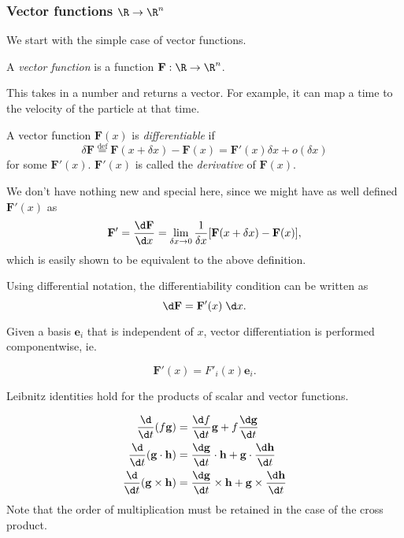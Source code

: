 \documentclass[a4paper]{article}
\begin{document}
\subsubsection*{Vector functions \texorpdfstring{$\R \to \R^n$}{R to Rn}}
We start with the simple case of vector functions.
\begin{defi}
  A \emph{vector function} is a function $\mathbf{F}: \R\to \R^n$.
\end{defi}
This takes in a number and returns a vector. For example, it can map a time to the velocity of the particle at that time.

\begin{defi}
  A vector function $\mathbf{F}(x)$ is \emph{differentiable} if
  \[
    \delta \mathbf{F} \stackrel{\text{def}}{=}\mathbf{F}(x + \delta x)- \mathbf{F}(x) = \mathbf{F}'(x)\delta x + o(\delta x)
  \]
  for some $\mathbf{F}'(x)$. $\mathbf{F}'(x)$ is called the \emph{derivative} of $\mathbf{F}(x)$.

\end{defi}
We don't have nothing new and special here, since we might have as well defined $\mathbf{F}'(x)$ as
\[
  \mathbf{F}' = \frac{\d \mathbf{F}}{\d x} = \lim_{\delta x \to 0} \frac{1}{\delta x}[\mathbf{F}(x + \delta x) - \mathbf{F}(x)],
\]
which is easily shown to be equivalent to the above definition.

Using differential notation, the differentiability condition can be written as
\[
  \d\mathbf{F} = \mathbf{F}'(x)\;\d x.
\]

Given a basis $\mathbf{e}_i$ that is independent of $x$, vector differentiation is performed componentwise, ie.
\begin{prop}
  \[
    \mathbf{F}'(x) = F'_i(x)\mathbf{e}_i.
  \]
\end{prop}
Leibnitz identities hold for the products of scalar and vector functions.
\begin{prop}
  \begin{align*}
    \frac{\d}{\d t}(f\mathbf{g}) &= \frac{\d f}{\d t}\mathbf{g} + f\frac{\d \mathbf{g}}{\d t}\\
    \frac{\d}{\d t}(\mathbf{g}\cdot \mathbf{h}) &= \frac{\d \mathbf{g}}{\d t}\cdot \mathbf{h} + \mathbf{g}\cdot \frac{\d \mathbf{h}}{\d t}\\
    \frac{\d}{\d t}(\mathbf{g}\times \mathbf{h}) &= \frac{\d \mathbf{g}}{\d t}\times \mathbf{h} + \mathbf{g}\times \frac{\d \mathbf{h}}{\d t}
  \end{align*}
  Note that the order of multiplication must be retained in the case of the cross product.
\end{prop}
\end{document}
